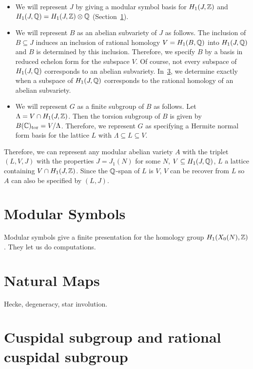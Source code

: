 \documentclass[11pt, proquest]{uwthesis}
\begin{document}
\begin{itemize}
    \item
        We will represent $J$ by giving a modular
        symbol basis for $H_1(J, \mathbb{Z})$ and $H_1(J, \mathbb{Q}) = H_1(J, \mathbb{Z})\otimes
        \mathbb{Q}$ (Section~\ref{sec:modular_symbols}).
    \item
        We will represent $B$ as an abelian subvariety of $J$ as follows. The
        inclusion of $B\subseteq J$ induces an inclusion of rational homology
        $V=H_1(B, \mathbb{Q})$ into $H_1(J, \mathbb{Q})$ and $B$ is determined by this
        inclusion. Therefore, we specify $B$ by a basis in reduced echelon form
        for the subspace $V$. Of course, not every subspace of $H_1(J, \mathbb{Q})$
        corresponds to an abelian subvariety. In~\ref{}, we determine exactly
        when a subspace of $H_1(J, \mathbb{Q})$ corresponds to the rational homology
        of an abelian subvariety.
    \item
        We will represent $G$ as a finite subgroup of $B$ as follows. Let
        $\Lambda=V\cap H_1(J, \mathbb{Z})$. Then the torsion subgroup of $B$ is given
        by $B(\mathbb{C})_{\mathrm{tor}}=V/\Lambda$. Therefore, we represent $G$ as specifying a
        Hermite normal form basis for the lattice $L$ with $\Lambda \subseteq L
        \subseteq V$.
\end{itemize}

Therefore, we can represent any modular abelian variety $A$ with the triplet
$(L, V, J)$ with the properties $J=J_1(N)$ for some $N$, $V\subseteq H_1(J,
\mathbb{Q})$, $L$ a lattice containing $V\cap H_1(J, \mathbb{Z})$. Since the $\mathbb{Q}$-span of
$L$ is $V$, $V$ can be recover from $L$ so $A$ can also be specified by $(L,
J)$.

\section{Modular Symbols}
\label{sec:modular_symbols}

Modular symbols give a finite presentation for the homology group $H_1(X_0(N),
\mathbb{Z})$. They let us do computations.

\section{Natural Maps}%
\label{sec:alg_natural_maps}

Hecke, degeneracy, star involution.


\section{Cuspidal subgroup and rational cuspidal subgroup}
\end{document}
